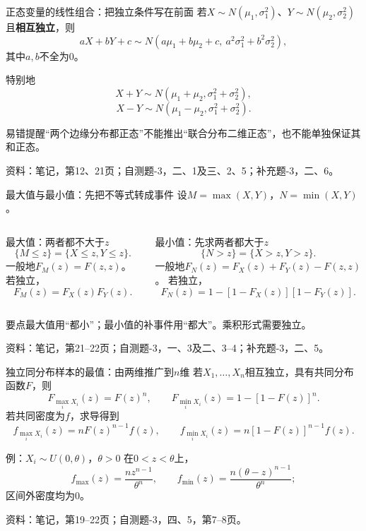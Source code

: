 \documentclass[aspectratio=169,10pt]{beamer}
\newcommand{\source}[1]{\vfill{\color{Muted}\fontsize{6.5}{8}\selectfont 资料：#1\par}}
\newcommand{\key}[1]{\begin{block}{要点}#1\end{block}}
\newcommand{\warn}[1]{\begin{alertblock}{易错提醒}#1\end{alertblock}}
\begin{document}
\begin{frame}[t]{正态变量的线性组合：把独立条件写在前面}
若$X\sim N(\mu_1,\sigma_1^2)$、$Y\sim N(\mu_2,\sigma_2^2)$且\textbf{相互独立}，则
\[
aX+bY+c\sim N\!\left(a\mu_1+b\mu_2+c,\ a^2\sigma_1^2+b^2\sigma_2^2\right),
\]
其中$a,b$不全为0。
\begin{block}{特别地}
\[
X+Y\sim N(\mu_1+\mu_2,\sigma_1^2+\sigma_2^2),
\]
\[
X-Y\sim N(\mu_1-\mu_2,\sigma_1^2+\sigma_2^2).
\]
\end{block}
\warn{“两个边缘分布都正态”不能推出“联合分布二维正态”，也不能单独保证其和正态。}
\source{笔记，第12、21页；自测题-3，二、1及三、2、5；补充题-3，二、6。}
\end{frame}

\begin{frame}[t]{最大值与最小值：先把不等式转成事件}
设$M=\max(X,Y)$，$N=\min(X,Y)$。
\begin{columns}[T]
\begin{block}{最大值：两者都不大于$z$}
\[
\{M\le z\}=\{X\le z,Y\le z\}.
\]
一般地$F_M(z)=F(z,z)$。
若独立，
\[
\boxed{F_M(z)=F_X(z)F_Y(z)}.
\]
\end{block}
\begin{block}{最小值：先求两者都大于$z$}
\[
\{N>z\}=\{X>z,Y>z\}.
\]
一般地$F_N(z)=F_X(z)+F_Y(z)-F(z,z)$。
若独立，
\[
\boxed{F_N(z)=1-[1-F_X(z)][1-F_Y(z)]}.
\]
\end{block}
\end{columns}
\key{最大值用“都小”；最小值的补事件用“都大”。乘积形式需要独立。}
\source{笔记，第21--22页；自测题-3，一、3及二、3--4；补充题-3，二、5。}
\end{frame}

\begin{frame}[t]{独立同分布样本的最值：由两维推广到$n$维}
若$X_1,\ldots,X_n$相互独立，具有共同分布函数$F$，则
\[
F_{\max_iX_i}(z)=F(z)^n,\qquad F_{\min_iX_i}(z)=1-[1-F(z)]^n.
\]
若共同密度为$f$，求导得到
\[
f_{\max_iX_i}(z)=nF(z)^{n-1}f(z),\qquad f_{\min_iX_i}(z)=n[1-F(z)]^{n-1}f(z).
\]
\begin{block}{例：$X_i\sim U(0,\theta)$，$\theta>0$}
在$0<z<\theta$上，
\[
f_{\max}(z)=\frac{nz^{n-1}}{\theta^n},\qquad f_{\min}(z)=\frac{n(\theta-z)^{n-1}}{\theta^n};
\]
区间外密度均为0。
\end{block}
\source{笔记，第19--22页；自测题-3，四、5，第7--8页。}
\end{frame}
\end{document}
